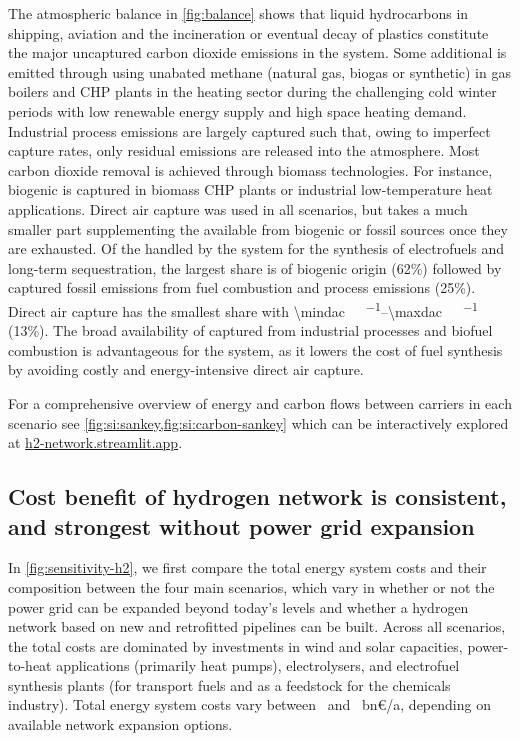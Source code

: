 The atmospheric \co balance in \cref{fig:balance} shows that liquid hydrocarbons
in shipping, aviation and the incineration or eventual decay of plastics
constitute the major uncaptured carbon dioxide emissions in the system. Some
additional \co is emitted through using unabated methane (natural gas, biogas or
synthetic) in gas boilers and CHP plants in the heating sector during the
challenging cold winter periods with low renewable energy supply and high space
heating demand. Industrial process emissions are largely captured such that,
owing to imperfect capture rates, only residual emissions are released into the
atmosphere. Most carbon dioxide removal is achieved through biomass
technologies. For instance, biogenic \co is captured in biomass CHP plants or
industrial low-temperature heat applications. Direct air capture was used in all
scenarios, but takes a much smaller part supplementing the \co available from
biogenic or fossil sources once they are exhausted. Of the \co handled by the
system for the synthesis of electrofuels and long-term sequestration, the
largest share is of biogenic origin (62\%) followed by captured fossil \co
emissions from fuel combustion and process emissions (25\%). Direct air capture
has the smallest share with \SIrange{\mindac}{\maxdac}{\mega\tco\per\year}
(13\%). The broad availability of captured \co from industrial processes and
biofuel combustion is advantageous for the system, as it lowers the cost of fuel
synthesis by avoiding costly and energy-intensive direct air capture.

For a comprehensive overview of energy and carbon flows between carriers in each
scenario see \cref{fig:si:sankey,fig:si:carbon-sankey} which can be
interactively explored at
\href{https://h2-network.streamlit.app}{h2-network.streamlit.app}.

\subsection*{Cost benefit of hydrogen network is consistent, and strongest without power grid expansion}
\label{sec:h2}

In \cref{fig:sensitivity-h2}, we first compare the total energy system costs and
their composition between the four main scenarios, which vary in whether or not
the power grid can be expanded beyond today's levels and whether a hydrogen
network based on new and retrofitted pipelines can be built. Across all
scenarios, the total costs are dominated by investments in wind and solar
capacities, power-to-heat applications (primarily heat pumps), electrolysers,
and electrofuel synthesis plants (for transport fuels and as a feedstock for the
chemicals industry). Total energy system costs vary between \minsystemcost~and
\maxsystemcost~bn\euro/a, depending on available network expansion options.

